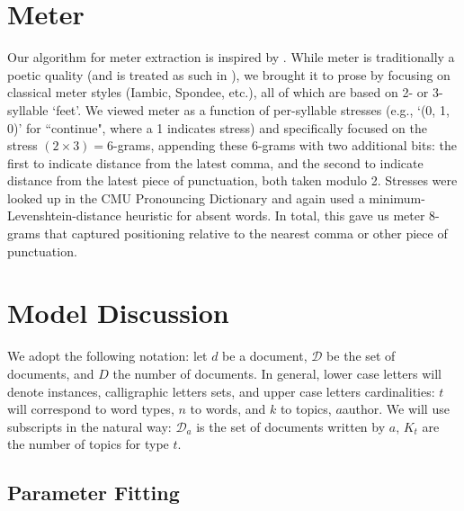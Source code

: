 \documentclass[14pt]{article} %
\theoremstyle{plain}
\theoremstyle{definition}
\theoremstyle{remark}
\begin{document}
\begin{appendix}


\section{Meter}
\label{appendix:meter}

Our algorithm for meter extraction is inspired by \citet{Genzel}. While meter is traditionally a poetic quality (and is treated as such in \citep{Genzel}), we brought it to prose by focusing on classical meter styles (Iambic, Spondee, etc.), all of which are based on 2- or 3-syllable `feet'. We viewed meter as a function of per-syllable stresses (e.g., `(0, 1, 0)' for ``continue", where a 1 indicates stress) and specifically focused on the stress $(2\times3)=6$-grams, appending these $6$-grams with two additional bits: the first to indicate distance from the latest comma, and the second to indicate distance from the latest piece of punctuation, both taken modulo 2. Stresses were looked up in the CMU Pronouncing Dictionary \citep{Lenzo} and again used a minimum-Levenshtein-distance heuristic for absent words. In total, this gave us meter $8$-grams that captured positioning relative to the nearest comma or other piece of punctuation.

\section{Model Discussion}
\label{appendix:model}

We adopt the following notation: let $d$ be a document, $\mathcal{D}$ be the set of documents, and $D$ the number of documents. In general, lower case letters will denote instances, calligraphic letters sets, and upper case letters cardinalities: $t$ will correspond to word types, $n$ to words, and $k$ to topics, $a$author. We will use subscripts in the natural way: $\mathcal{D}_a$ is the set of documents written by $a$, $K_t$ are the number of topics for type $t$.

\subsection{Parameter Fitting}
\label{appendix:parameter_fitting}


\end{appendix}
\end{document}
